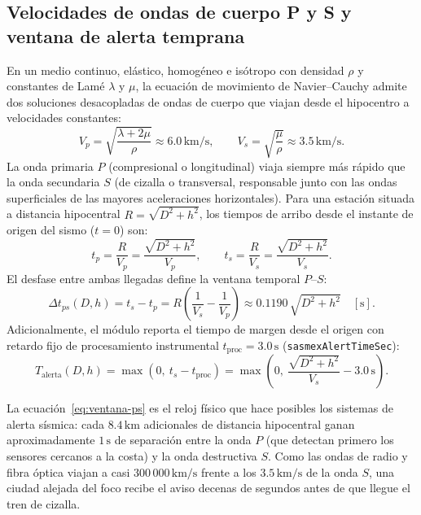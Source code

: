 \documentclass[11pt,a4paper]{article}
\newcommand{\unit}[1]{\mathrm{#1}}
\begin{document}
\subsection{Velocidades de ondas de cuerpo P y S y ventana de alerta temprana}
\label{sec:sismo-tiempos}

En un medio continuo, elástico, homogéneo e isótropo con densidad $\rho$ y constantes de Lamé $\lambda$ y $\mu$,
la ecuación de movimiento de Navier--Cauchy admite dos soluciones desacopladas de ondas de cuerpo que viajan
desde el hipocentro a velocidades constantes:
\begin{equation}
  V_p = \sqrt{\frac{\lambda + 2\mu}{\rho}} \approx 6.0\,\unit{km/s},
  \qquad
  V_s = \sqrt{\frac{\mu}{\rho}} \approx 3.5\,\unit{km/s}.
  \label{eq:velocidades-ps}
\end{equation}
La onda primaria $P$ (compresional o longitudinal) viaja siempre más rápido que la onda secundaria $S$ (de
cizalla o transversal, responsable junto con las ondas superficiales de las mayores aceleraciones horizontales).
Para una estación situada a distancia hipocentral $R = \sqrt{D^2 + h^2}$, los tiempos de arribo desde el
instante de origen del sismo ($t=0$) son:
\begin{equation}
  t_p = \frac{R}{V_p} = \frac{\sqrt{D^2 + h^2}}{V_p},
  \qquad
  t_s = \frac{R}{V_s} = \frac{\sqrt{D^2 + h^2}}{V_s}.
  \label{eq:tiempos-arribo}
\end{equation}
El desfase entre ambas llegadas define la ventana temporal $P\text{--}S$:
\begin{equation}
  \Delta t_{ps}(D,h) = t_s - t_p = R\left(\frac{1}{V_s} - \frac{1}{V_p}\right)
  \approx 0.1190\,\sqrt{D^2 + h^2}\quad[\unit{s}].
  \label{eq:ventana-ps}
\end{equation}
Adicionalmente, el módulo reporta el tiempo de margen desde el origen con retardo fijo de procesamiento
instrumental $t_{\mathrm{proc}} = 3.0\,\unit{s}$ (\texttt{sasmexAlertTimeSec}):
\begin{equation}
  T_{\mathrm{alerta}}(D,h) = \max\!\left(0,\ t_s - t_{\mathrm{proc}}\right)
  = \max\!\left(0,\ \frac{\sqrt{D^2 + h^2}}{V_s} - 3.0\,\unit{s}\right).
  \label{eq:tiempo-sasmex}
\end{equation}

\begin{intuicion}
La ecuación~\eqref{eq:ventana-ps} es el reloj físico que hace posibles los sistemas de alerta sísmica: cada
$8.4\,\unit{km}$ adicionales de distancia hipocentral ganan aproximadamente $1\,\unit{s}$ de separación entre la
onda $P$ (que detectan primero los sensores cercanos a la costa) y la onda destructiva $S$. Como las ondas de
radio y fibra óptica viajan a casi $300\,000\,\unit{km/s}$ frente a los $3.5\,\unit{km/s}$ de la onda $S$, una
ciudad alejada del foco recibe el aviso decenas de segundos antes de que llegue el tren de cizalla.
\end{intuicion}
\end{document}
